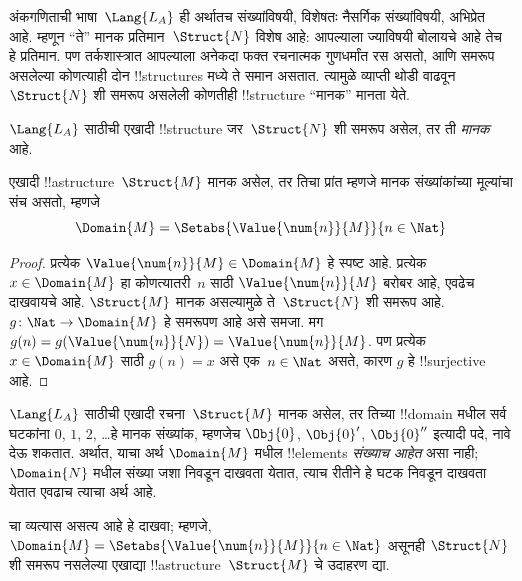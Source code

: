 \documentclass[../../../include/open-logic-section]{subfiles}
\begin{document}

अंकगणिताची भाषा~$\Lang{L_A}$ ही अर्थातच संख्यांविषयी, विशेषतः नैसर्गिक
संख्यांविषयी, अभिप्रेत आहे. म्हणून ``ते'' मानक प्रतिमान~$\Struct{N}$ विशेष
आहे: आपल्याला ज्याविषयी बोलायचे आहे तेच हे प्रतिमान. पण तर्कशास्त्रात
आपल्याला अनेकदा फक्त रचनात्मक गुणधर्मांत रस असतो, आणि समरूप असलेल्या कोणत्याही
दोन !!{structure}s मध्ये ते समान असतात. त्यामुळे व्याप्ती थोडी वाढवून
$\Struct{N}$ शी समरूप असलेली कोणतीही !!{structure} ``मानक'' मानता येते.

\begin{defn}
$\Lang{L_A}$ साठीची एखादी !!{structure} जर~$\Struct{N}$ शी समरूप असेल,
तर ती \emph{मानक} आहे.
\end{defn}

\begin{prop}
 एखादी !!a{structure}~$\Struct{M}$ मानक असेल,
तर तिचा प्रांत म्हणजे मानक संख्यांकांच्या मूल्यांचा संच असतो, म्हणजे
\[
\Domain{M} = \Setabs{\Value{\num{n}}{M}}{n \in \Nat}
\]
\end{prop}

\begin{proof}
प्रत्येक $\Value{\num{n}}{M} \in \Domain{M}$ हे स्पष्ट आहे. प्रत्येक
$x \in \Domain{M}$ हा कोणत्यातरी~$n$ साठी $\Value{\num{n}}{M}$ बरोबर आहे,
एवढेच दाखवायचे आहे. $\Struct{M}$ मानक असल्यामुळे ते~$\Struct{N}$ शी समरूप
आहे. $g\colon \Nat \to \Domain{M}$ हे समरूपण आहे असे समजा. मग
$g(n) = g(\Value{\num{n}}{N}) = \Value{\num{n}}{M}$. पण प्रत्येक
$x \in \Domain{M}$ साठी $g(n) = x$ असे एक~$n \in \Nat$ असते, कारण
$g$ हे !!{surjective} आहे.
\end{proof}

\begin{explain}
$\Lang{L_A}$ साठीची एखादी रचना~$\Struct{M}$ मानक असेल, तर तिच्या
!!{domain} मधील सर्व घटकांना $\num{0}$, $\num{1}$, $\num{2}$, \dots हे
मानक संख्यांक, म्हणजेच $\Obj{0}$, $\Obj{0}'$, $\Obj{0}''$ इत्यादी पदे,
नावे देऊ शकतात. अर्थात, याचा अर्थ $\Domain{M}$ मधील !!{element}s
\emph{संख्याच आहेत} असा नाही; $\Domain{N}$ मधील संख्या जशा निवडून दाखवता
येतात, त्याच रीतीने हे घटक निवडून दाखवता येतात एवढाच त्याचा अर्थ आहे.
\end{explain}

\begin{prob}
 चा व्यत्यास असत्य आहे हे दाखवा;
म्हणजे, $\Domain{M} = \Setabs{\Value{\num{n}}{M}}{n \in \Nat}$ असूनही
$\Struct{N}$ शी समरूप नसलेल्या एखाद्या !!a{structure}~$\Struct{M}$ चे
उदाहरण द्या.
\end{prob}
\end{document}
